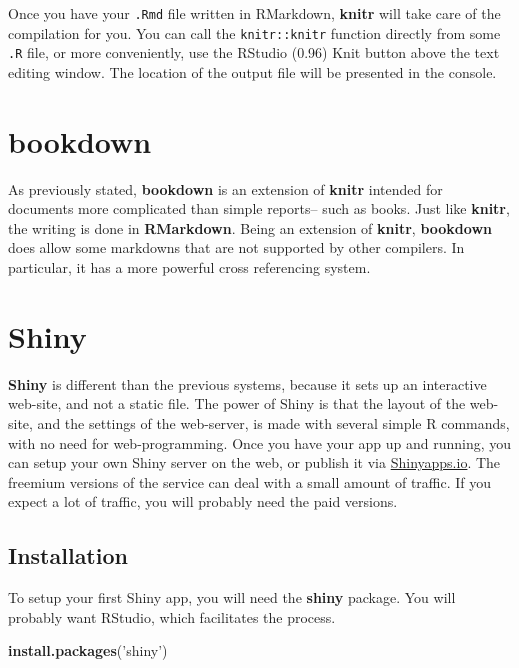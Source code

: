 \documentclass[]{book}
\newenvironment{Shaded}{\begin{snugshade}}{\end{snugshade}}
\newcommand{\KeywordTok}[1]{\textcolor[rgb]{0.13,0.29,0.53}{\textbf{#1}}}
\newcommand{\StringTok}[1]{\textcolor[rgb]{0.31,0.60,0.02}{#1}}
\newcommand{\NormalTok}[1]{#1}
\theoremstyle{definition}
\theoremstyle{definition}
\theoremstyle{definition}
\theoremstyle{remark}
\begin{document}
Once you have your \texttt{.Rmd} file written in RMarkdown,
\textbf{knitr} will take care of the compilation for you. You can call
the \texttt{knitr::knitr} function directly from some \texttt{.R} file,
or more conveniently, use the RStudio (0.96) Knit button above the text
editing window. The location of the output file will be presented in the
console.

\section{bookdown}\label{bookdown}

As previously stated, \textbf{bookdown} is an extension of
\textbf{knitr} intended for documents more complicated than simple
reports-- such as books. Just like \textbf{knitr}, the writing is done
in \textbf{RMarkdown}. Being an extension of \textbf{knitr},
\textbf{bookdown} does allow some markdowns that are not supported by
other compilers. In particular, it has a more powerful cross referencing
system.

\section{Shiny}\label{shiny}

\textbf{Shiny} \citep{shiny} is different than the previous systems,
because it sets up an interactive web-site, and not a static file. The
power of Shiny is that the layout of the web-site, and the settings of
the web-server, is made with several simple R commands, with no need for
web-programming. Once you have your app up and running, you can setup
your own Shiny server on the web, or publish it via
\href{https://www.shinyapps.io/}{Shinyapps.io}. The freemium versions of
the service can deal with a small amount of traffic. If you expect a lot
of traffic, you will probably need the paid versions.

\subsection{Installation}\label{installation-1}

To setup your first Shiny app, you will need the \textbf{shiny} package.
You will probably want RStudio, which facilitates the process.

\begin{Shaded}
\begin{Highlighting}[]
\KeywordTok{install.packages}\NormalTok{(}\StringTok{'shiny'}\NormalTok{)}
\end{Highlighting}
\end{Shaded}
\end{document}
